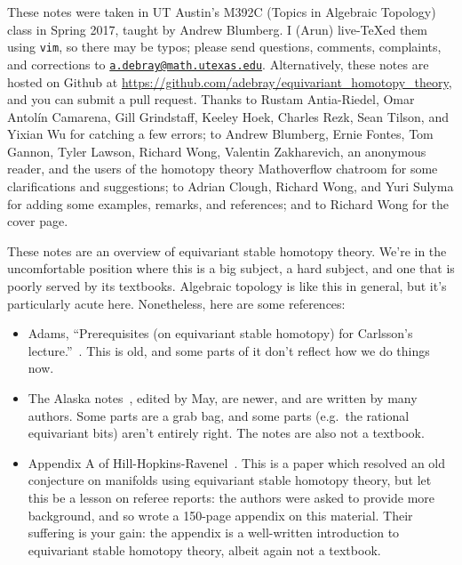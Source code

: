 
\versioninfo

These notes were taken in UT Austin’s M392C (Topics in Algebraic Topology) class in Spring 2017, taught by Andrew
Blumberg. I (Arun) live-\TeX ed them using \texttt{vim}, so there may be typos; please send questions, comments,
complaints, and corrections to
\href{mailto:a.debray@math.utexas.edu?subject=M392C\%20Lecture\%20Notes}{\texttt{a.debray@math.utexas.edu}}.
Alternatively, these notes are hosted on Github at \url{https://github.com/adebray/equivariant_homotopy_theory},
and you can submit a pull request. Thanks to Rustam Antia-Riedel, Omar Antolín Camarena, Gill Grindstaff, Keeley
Hoek, Charles Rezk, Sean Tilson, and Yixian Wu for catching a few errors; to Andrew Blumberg, Ernie Fontes, Tom
Gannon, Tyler Lawson, Richard Wong, Valentin Zakharevich, an anonymous reader, and the users of the homotopy theory
Mathoverflow chatroom for some clarifications and suggestions; to Adrian Clough, Richard Wong, and Yuri Sulyma for
adding some examples, remarks, and references; and to Richard Wong for the cover page.


\orbreak

These notes are an overview of equivariant stable homotopy theory. We're in the uncomfortable position where this
is a big subject, a hard subject, and one that is poorly served by its textbooks. Algebraic topology is like this
in general, but it's particularly acute here. Nonetheless, here are some references:
\begin{itemize}
	\item Adams, ``Prerequisites (on equivariant stable homotopy) for Carlsson's lecture.''~\cite{Adams84}. This is
	old, and some parts of it don't reflect how we do things now.
	\item The Alaska notes~\cite{AlaskaNotes}, edited by May, are newer, and are written by many authors. Some
	parts are a grab bag, and some parts (e.g.\ the rational equivariant bits) aren't entirely right. The notes are
	also not a textbook.
	\item Appendix A of Hill-Hopkins-Ravenel~\cite{HHR}. This is a paper which resolved an old conjecture on
	manifolds using equivariant stable homotopy theory, but let this be a lesson on referee reports: the authors
	were asked to provide more background, and so wrote a 150-page appendix on this material. Their suffering is
	your gain: the appendix is a well-written introduction to equivariant stable homotopy theory, albeit again not
	a textbook.
\end{itemize}

